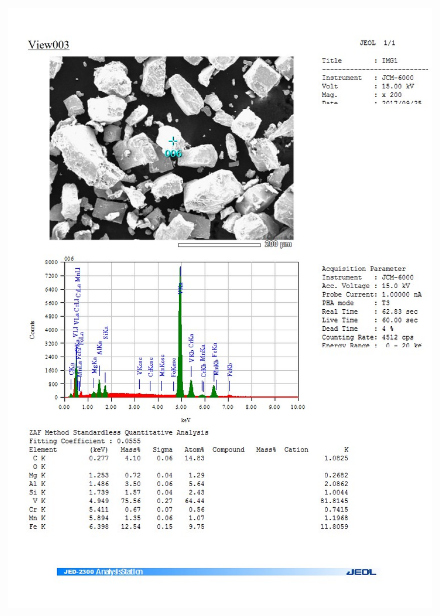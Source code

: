 \documentclass[12pt]{article}
\begin{document}
\begin{figure}[H]
	\includegraphics[width = \linewidth]{./pictures/dot_spec_6.jpg}
\end{figure}
\end{document}
